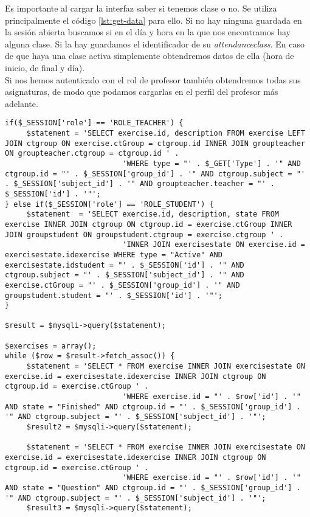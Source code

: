Es importante al cargar la interfaz saber si tenemos clase o no. Se utiliza principalmente el código \ref{lst:get-data} para ello. Si no hay ninguna guardada en la sesión abierta buscamos si en el día y hora en la que nos encontramos hay alguna clase. Si la hay guardamos el identificador de su \textit{attendanceclass}. En caso de que haya una clase activa simplemente obtendremos datos de ella (hora de inicio, de final y día).\\

Si nos hemos autenticado con el rol de profesor también obtendremos todas sus asignaturas, de modo que podamos cargarlas en el perfil del profesor más adelante.\\

\noindent
\begin{lstlisting}[caption=Cargar los ejercicios del tipo pasado por parámetro.,label={lst:carga-ejercicios}]
if($_SESSION['role'] == 'ROLE_TEACHER') {
     $statement = 'SELECT exercise.id, description FROM exercise LEFT JOIN ctgroup ON exercise.ctGroup = ctgroup.id INNER JOIN groupteacher ON groupteacher.ctgroup = ctgroup.id ' .
                           'WHERE type = "' . $_GET['Type'] . '" AND ctgroup.id = "' . $_SESSION['group_id'] . '" AND ctgroup.subject = "' . $_SESSION['subject_id'] . '" AND groupteacher.teacher = "' . $_SESSION['id'] . '"';
} else if($_SESSION['role'] == 'ROLE_STUDENT') {
     $statement  = 'SELECT exercise.id, description, state FROM exercise INNER JOIN ctgroup ON ctgroup.id = exercise.ctGroup INNER JOIN groupstudent ON groupstudent.ctgroup = exercise.ctgroup ' .
                           'INNER JOIN exercisestate ON exercise.id = exercisestate.idexercise WHERE type = "Active" AND exercisestate.idstudent = "' . $_SESSION['id'] . '" AND ctgroup.subject = "' . $_SESSION['subject_id'] . '" AND exercise.ctGroup = "' . $_SESSION['group_id'] . '" AND groupstudent.student = "' . $_SESSION['id'] . '"';
}

$result = $mysqli->query($statement);

$exercises = array();
while ($row = $result->fetch_assoc()) {
     $statement = 'SELECT * FROM exercise INNER JOIN exercisestate ON exercise.id = exercisestate.idexercise INNER JOIN ctgroup ON ctgroup.id = exercise.ctGroup ' .
                           'WHERE exercise.id = "' . $row['id'] . '" AND state = "Finished" AND ctgroup.id = "' . $_SESSION['group_id'] . '" AND ctgroup.subject = "' . $_SESSION['subject_id'] . '"';
     $result2 = $mysqli->query($statement);

     $statement = 'SELECT * FROM exercise INNER JOIN exercisestate ON exercise.id = exercisestate.idexercise INNER JOIN ctgroup ON ctgroup.id = exercise.ctGroup ' .
                           'WHERE exercise.id = "' . $row['id'] . '" AND state = "Question" AND ctgroup.id = "' . $_SESSION['group_id'] . '" AND ctgroup.subject = "' . $_SESSION['subject_id'] . '"';
     $result3 = $mysqli->query($statement);


\end{lstlisting}
